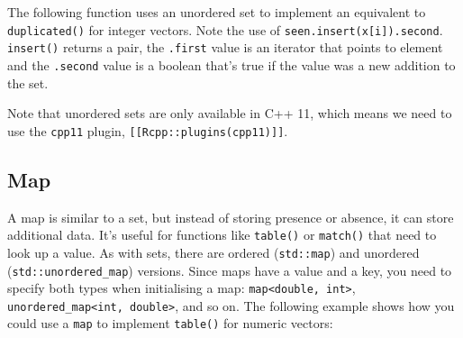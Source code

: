 The following function uses an unordered set to implement an equivalent
to \texttt{duplicated()} for integer vectors. Note the use of
\texttt{seen.insert(x{[}i{]}).second}. \texttt{insert()} returns a pair,
the \texttt{.first} value is an iterator that points to element and the
\texttt{.second} value is a boolean that's true if the value was a new
addition to the set.

\begin{Shaded}
\begin{Highlighting}[]
  

   

   \NormalTok{(} 
  \NormalTok{\}}

   
\NormalTok{\}}
\end{Highlighting}
\end{Shaded}

Note that unordered sets are only available in C++ 11, which means we
need to use the \texttt{cpp11} plugin,
\texttt{{[}{[}Rcpp::plugins(cpp11){]}{]}}.

\subsection{Map}

A map is similar to a set, but instead of storing presence or absence,
it can store additional data. It's useful for functions like
\texttt{table()} or \texttt{match()} that need to look up a value. As
with sets, there are ordered (\texttt{std::map}) and unordered
(\texttt{std::unordered\_map}) versions. Since maps have a value and a
key, you need to specify both types when initialising a map:
\texttt{map\textless{}double, int\textgreater{}},
\texttt{unordered\_map\textless{}int, double\textgreater{}}, and so on.
The following example shows how you could use a \texttt{map} to
implement \texttt{table()} for numeric vectors: 

